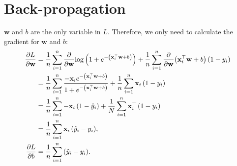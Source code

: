 \documentclass{article}
\begin{document}
\section{Back-propagation}
$\mathbf{w}$ and $b$ are the only variable in $L$. Therefore, we only need to calculate the gradient for $\mathbf{w}$ and $b$:
\begin{align}
    \frac{\partial L}{\partial\mathbf{w}} &= \frac{1}{n}\sum_{i = 1}^{n}{\frac{\partial}{\partial\mathbf{w}}{\log\left(1 + e^{-\left(\mathbf{x}^\top_i\mathbf{w} + b\right)}\right)}} + \frac{1}{n}\sum_{i = 1}^{n}{\frac{\partial}{\partial\mathbf{w}}{\left(\mathbf{x}^\top_i\mathbf{w} + b\right)\left(1 - y_i\right)}} \\
    &= \frac{1}{n}\sum_{i = 1}^{n}{\frac{-\mathbf{x}_ie^{-\left(\mathbf{x}^\top_i\mathbf{w} + b\right)}}{1 + e^{-\left(\mathbf{x}^\top_i\mathbf{w} + b\right)}}} + \frac{1}{n}\sum_{i = 1}^{n}{\mathbf{x}_i\left(1 - y_i\right)} \\
    &= \frac{1}{n}\sum_{i = 1}^{n}{-\mathbf{x}_i\left(1 - \hat{y}_i\right)} + \frac{1}{N}\sum_{i = 1}^{n}{\mathbf{x}_i^\top\left(1 - y_i\right)} \\
    &= \frac{1}{n}\sum_{i = 1}^{n}{\mathbf{x}_i\left(\hat{y}_i - y_i\right)}, \\
    \frac{\partial L}{\partial b} &= \frac{1}{n}\sum_{i = 1}^{n}{\left(\hat{y}_i - y_i\right)}.
\end{align}
\end{document}
